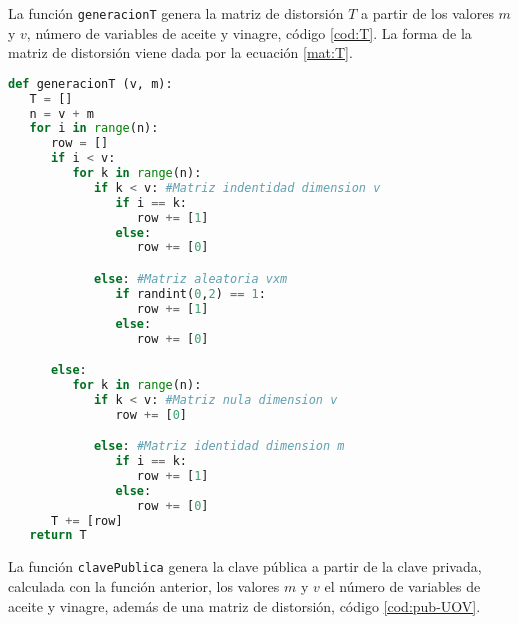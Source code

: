 La función \texttt{generacionT} genera la matriz de distorsión $T$ a partir de los valores $m$ y $v$, número de variables de aceite y vinagre, código \ref{cod:T}. La forma de la matriz de distorsión viene dada por la ecuación \ref{mat:T}.

\begin{table}[h]
	\begin{center}
	\centering
	\end{center}
	\caption{Parámetros de la función \texttt{generacionT}}
\end{table}

\vspace{0.25cm}

\begin{lstlisting}[language=Python,caption=Generación matriz $T$, label=cod:T]
def generacionT (v, m):
   T = []
   n = v + m
   for i in range(n):
      row = []
      if i < v:
         for k in range(n):
            if k < v: #Matriz indentidad dimension v
               if i == k:
                  row += [1]
               else:
                  row += [0]

            else: #Matriz aleatoria vxm
               if randint(0,2) == 1:
                  row += [1]
               else:
                  row += [0]

      else:
         for k in range(n):
            if k < v: #Matriz nula dimension v
               row += [0]

            else: #Matriz identidad dimension m
               if i == k:
                  row += [1]
               else:
                  row += [0]
      T += [row]
   return T
\end{lstlisting}

La función \texttt{clavePublica} genera la clave pública a partir de la clave privada, calculada con la función anterior, los valores $m$ y $v$ el número de variables de aceite y vinagre, además de una matriz de distorsión, código \ref{cod:pub-UOV}.

